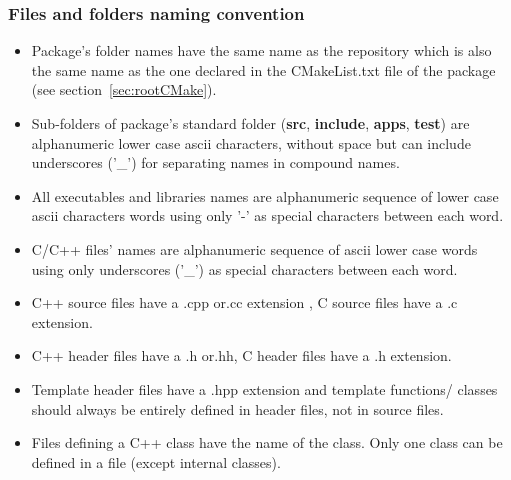 \documentclass[12pt,a4paper]{article}
\begin{document}
\subsubsection{Files and folders naming convention}
\begin{itemize}
\item Package's folder names have the same name as the repository which is also the same name as the one declared in the CMakeList.txt file of the package (see section~\ref{sec:rootCMake}).
\item Sub-folders of package's standard folder (\textbf{src}, \textbf{include}, \textbf{apps}, \textbf{test}) are alphanumeric lower case ascii characters, without space but can include underscores ('\_') for separating names in compound names.
\item All executables and libraries names are alphanumeric sequence of lower case ascii characters words using only  '-' as special characters between each word.
\item C/C++ files' names are alphanumeric sequence of ascii lower case words using only underscores ('\_') as special characters between each word.
\item C++ source files have a .cpp or.cc extension , C source files have a .c extension. 
\item C++ header files  have a .h or.hh, C header files have a .h extension.
\item Template header files have a .hpp extension and template functions/ classes should always be entirely defined in header files, not in source files.
\item Files defining a C++ class have the name of the class. Only one class can be defined in a file (except internal classes).
\end{itemize}
\end{document}
